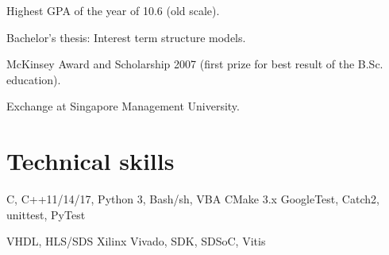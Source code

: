 \documentclass[a4paper]{janus-resume}
\begin{document}
\begin{minipage}[t]{0.49\textwidth}
\sectionspace %

Highest GPA of the year of 10.6 (old scale).
\begin{tightitemize}
\item Bachelor's thesis: Interest term structure models. \\
\item McKinsey Award and Scholarship 2007 (first prize for best result of the B.Sc. education). \\
\item Exchange at Singapore Management University. \\
\end{tightitemize}

\sectionspace %




\sectionspace %


\section{Technical skills}


C, C++11/14/17, Python 3, Bash/sh, VBA
\bluebullet{} CMake 3.x
\bluebullet {} GoogleTest, Catch2, 
 unittest, PyTest \\
\sectionspace %

VHDL, HLS/SDS
\bluebullet{} Xilinx Vivado, SDK, SDSoC, Vitis
\sectionspace %


\end{minipage}
\end{document}
